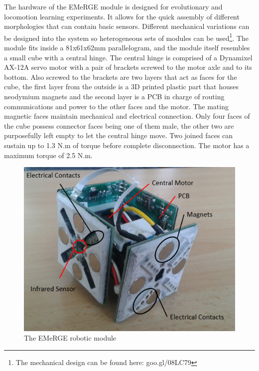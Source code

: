 \documentclass[sigconf]{acmart}
\begin{document}
The hardware of the EMeRGE module is designed for evolutionary and locomotion learning experiments. It allows for the quick assembly of different morphologies that can contain basic sensors. Different mechanical variations can be designed into the system so heterogeneous sets of modules can be used\footnote{The mechanical design can be found here: goo.gl/08LC79}. The module fits inside a 81x61x62mm parallelogram, and the module itself resembles a small cube with a central hinge. The central hinge is comprised of a Dynamixel AX-12A servo motor with a pair of brackets screwed to the motor axle and to its bottom. Also screwed to the brackets are two layers that act as faces for the cube, the first layer from the outside is a 3D printed plastic part that houses neodymium magnets and the second layer is a PCB in charge of routing communications and power to the other faces and the motor. The mating magnetic faces maintain mechanical and electrical connection. Only four faces of the cube possess connector faces being one of them male, the other two are purposefully left empty to let the central hinge move. Two joined faces can sustain up to 1.3 N.m of torque before complete disconnection. The motor has a maximum torque of 2.5 N.m.  
% 
% 
% 

\begin{figure}
 \centering
 \includegraphics[width=0.8\columnwidth]{ModuleInd.png}
 \caption{\label{fig:module} The EMeRGE robotic module}
 \end{figure}
\end{document}
